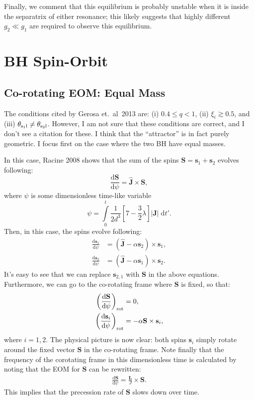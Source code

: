 \documentclass[11pt,
        usenames, %
        dvipsnames %
    ]{article}
\newcommand*{\rd}[2]{\frac{\mathrm{d}#1}{\mathrm{d}#2}}
\newcommand*{\bm}[1]{\boldsymbol{\mathbf{#1}}}
\newcommand*{\uv}[1]{\hat{\bm{#1}}}
\newcommand*{\abs}[1]{\left|#1\right|}
\newcommand*{\p}[1]{\left(#1\right)}
\newcommand*{\s}[1]{\left[#1\right]}
\begin{document}
Finally, we comment that this equilibrium is probably unstable when it is inside
the separatrix of either resonance; this likely suggests that highly different
$g_2 \ll g_1$ are required to observe this equilibrium.

\section{BH Spin-Orbit}

\subsection{Co-rotating EOM\@: Equal Mass}

The conditions cited by Gerosa et.\ al\ 2013 are: (i) $0.4 \leq q < 1$, (ii)
$\xi_i \gtrsim 0.5$, and (iii) $\theta_{\rm s_1l} \neq \theta_{\rm s_2l}$.
However, I am not sure that these conditions are correct, and I don't see a
citation for these. I think that the ``attractor'' is in fact purely geometric.
I focus first on the case where the two BH have equal masses.

In this case, Racine 2008 shows that the sum of the spins $\bm{S} = \bm{s}_1 +
\bm{s}_2$ evolves following:
\begin{equation}
    \rd{\bm{S}}{\psi} = \uv{J} \times \bm{S},
\end{equation}
where $\psi$ is some dimensionless time-like variable
\begin{equation}
    \psi = \int\limits_0^t
        \frac{1}{2d^3}
            \s{7 - \frac{3}{2}\lambda}\abs{\bm{J}}\;\mathrm{d}t'.
\end{equation}
Then, in this case, the spins evolve following:
\begin{align}
    \rd{\bm{s}_1}{\psi} &= \p{\uv{J} - \alpha \bm{s}_2} \times \bm{s}_1,\\
    \rd{\bm{s}_2}{\psi} &= \p{\uv{J} - \alpha \bm{s}_1} \times \bm{s}_2.
\end{align}
It's easy to see that we can replace $\bm{s}_{2, 1}$ with $\bm{S}$ in the above
equations. Furthermore, we can go to the co-rotating frame where $\bm{S}$ is
fixed, so that:
\begin{align}
    \p{\rd{\bm{S}}{\psi}}_{\rm rot} &= 0,\\
    \p{\rd{\bm{s}_i}{\psi}}_{\rm rot} &= -\alpha \bm{S} \times \bm{s}_i,
\end{align}
where $i = 1, 2$. The physical picture is now clear: both spins $\bm{s}_i$
simply rotate around the fixed vector $\bm{S}$ in the co-rotating frame. Note
finally that the frequency of the corotating frame in this dimensionless time is
calculated by noting that the EOM for $\bm{S}$ can be rewritten:
\begin{align}
    \rd{\bm{S}}{\psi} = \frac{\bm{L}}{J} \times \bm{S}.
\end{align}
This implies that the precession rate of $\bm{S}$ slows down over time.
\end{document}
